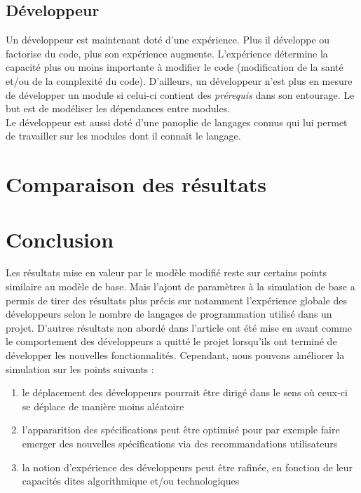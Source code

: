 \documentclass{article}
\begin{document}
\newpage
\subsection{Développeur}
Un développeur est maintenant doté d'une expérience. Plus il développe ou factorise du code, plus son expérience augmente. L'expérience détermine la capacité plus ou moins importante à modifier le code (modification de la santé et/ou de la complexité du code). 
D'ailleurs, un développeur n'est plus en mesure de développer un module si celui-ci contient des \textit{prérequis} dans son entourage. Le but est de modéliser les dépendances entre modules.
\\

Le développeur est aussi doté d'une panoplie de langages connus qui lui permet de travailler sur les modules dont il connait le langage.

\section{Comparaison des résultats}






\section{Conclusion}
Les résultats mise en valeur par le modèle modifié reste sur certains points similaire au modèle de base.
Mais l'ajout de paramètres à la simulation de base a permis de tirer des
résultats plus précis sur notamment l'expérience globale des développeurs selon le nombre de langages de programmation
utilisé dans un projet. D'autres résultats non abordé dans l'article ont été mise en avant comme le comportement des développeurs
a quitté le projet lorsqu'ils ont terminé de développer les nouvelles fonctionnalités. Cependant, nous pouvons améliorer la simulation sur les
points suivants :
\begin{enumerate}
\item{le déplacement des développeurs pourrait être dirigé dans le sens où ceux-ci se déplace de manière moins aléatoire}
\item{l'appararition des spécifications peut être optimisé pour par exemple faire emerger des nouvelles spécifications via des recommandations utilisateurs}
\item{la notion d'expérience des développeurs peut être rafinée, en
    fonction de leur capacités dites algorithmique et/ou technologiques}
\end{enumerate} 
\end{document}
